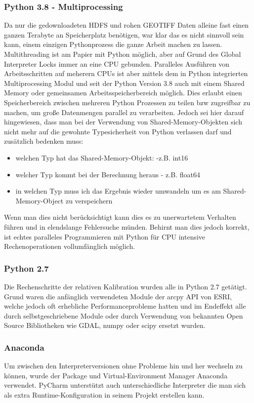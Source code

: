 \documentclass[11pt]{report}
\begin{document}
\subsubsection{Python 3.8 - Multiprocessing}
Da nur die gedownloadeten HDFS und rohen GEOTIFF Daten alleine fast einen ganzen Terabyte an Speicherplatz benötigen, war klar das es nicht sinnvoll sein kann, einem einzigen Pythonprozess die ganze Arbeit machen zu lassen. Multithreading ist am Papier mit Python möglich, aber auf Grund des Global Interpreter Locks immer an eine CPU gebunden. Paralleles Ausführen von Arbeitsschritten auf meherern CPUs ist aber mittels dem in Python integrierten Multiprocessing Modul und seit der Python Version 3.8 auch mit einem Shared Memory oder gemeinsamen Arbeitsspeicherbereich möglich. Dies erlaubt einen Speicherbereich zwischen mehreren Python Prozessen zu teilen bzw zugreifbar zu machen, um große Datenmengen parallel zu verarbeiten. Jedoch sei hier darauf hingewiesen, dass man bei der Verwendung von Shared-Memory-Objekten sich nicht mehr auf die gewohnte Typesicherheit von Python verlassen darf und zusätzlich bedenken muss: 
\begin{itemize}
\item welchen Typ hat das Shared-Memory-Objekt: -z.B. int16
\item welcher Typ kommt bei der Berechnung heraus - z.B. float64
\item in welchen Typ muss ich das Ergebnis wieder umwandeln um es am Shared-Memory-Object zu verspeichern
\end{itemize}
Wenn man dies nicht berücksichtigt kann dies es zu unerwartetem Verhalten führen und in elendslange Fehlersuche münden. Behirnt man dies jedoch korrekt, ist echtes paralleles Programmieren mit Python für CPU intensive Rechenoperationen vollumfänglich möglich.
\subsubsection{Python 2.7}
Die Rechenschritte der relativen Kalibration wurden alle in Python 2.7 getätigt. Grund waren die anfänglich verwendeten Module der arcpy API von ESRI, welche jedoch oft erhebliche Performanceprobleme hatten und im Endeffekt alle durch selbstgeschriebene Module oder durch Verwendung von bekannten Open Source Bibliotheken wie GDAL, numpy oder scipy ersetzt wurden.

\subsubsection{Anaconda}
Um zwischen den Interpreterversionen ohne Probleme hin und her wechseln zu können, wurde der Package und Virtual-Environment Manager Anaconda verwendet. PyCharm unterstützt auch unterschiedliche Interpreter die man sich als extra Runtime-Konfiguration in seinem Projekt erstellen kann.
\end{document}
